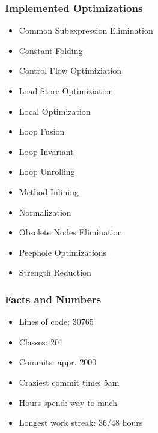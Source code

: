 \documentclass[t]{beamer}
\begin{document}
\begin{frame}
  \frametitle{Implemented Optimizations}
\begin{itemize}
\item Common Subexpression Elimination
\item Constant Folding
\item Control Flow Optimiziation
\item Load Store Optimiziation
\item Local Optimization
\item Loop Fusion
\item Loop Invariant
\item Loop Unrolling
\item Method Inlining
\item Normalization
\item Obsolete Nodes Elimination
\item Peephole Optimizations
\item Strength Reduction
\end{itemize}
\end{frame}

\begin{frame}
  \frametitle{Facts and Numbers}
\begin{itemize}
\item Lines of code: 30765
\item Classes: 201
\item Commits: appr. 2000 
\item Craziest commit time: 5am
\item Hours spend: way to much
\item Longest work streak: 36/48 hours
\end{itemize}
\end{frame}
\end{document}
